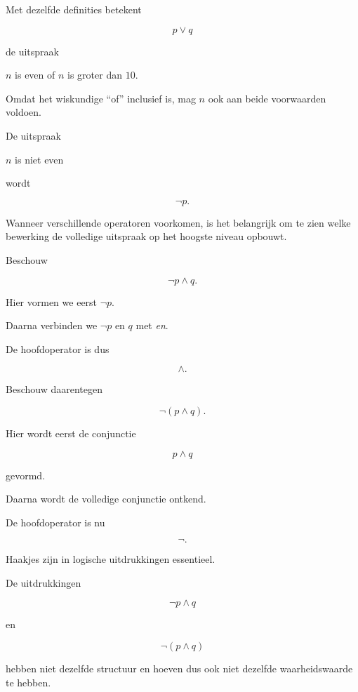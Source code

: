 \documentclass{ximera}
\begin{document}
  \begin{voorbeeld}

  Met dezelfde definities betekent

  \[
  p\lor q
  \]

  de uitspraak

  \begin{center}
  $n$ is even of $n$ is groter dan $10$.
  \end{center}

  Omdat het wiskundige ``of'' inclusief is, mag $n$ ook aan beide
  voorwaarden voldoen.
  \end{voorbeeld}


  \begin{voorbeeld}

  De uitspraak

  \begin{center}
  $n$ is niet even
  \end{center}

  wordt

  \[
  \neg p.
  \]
  \end{voorbeeld}



  Wanneer verschillende operatoren voorkomen, is het belangrijk om te
  zien welke bewerking de volledige uitspraak op het hoogste niveau
  opbouwt.

  Beschouw

  \[
  \neg p\land q.
  \]

  Hier vormen we eerst $\neg p$.

  Daarna verbinden we $\neg p$ en $q$ met \emph{en}.

  De hoofdoperator is dus

  \[
  \land.
  \]


  Beschouw daarentegen

  \[
  \neg(p\land q).
  \]

  Hier wordt eerst de conjunctie

  \[
  p\land q
  \]

  gevormd.

  Daarna wordt de volledige conjunctie ontkend.

  De hoofdoperator is nu

  \[
  \neg.
  \]


  \begin{opmerking}
  Haakjes zijn in logische uitdrukkingen essentieel.

  De uitdrukkingen

  \[
  \neg p\land q
  \]

  en

  \[
  \neg(p\land q)
  \]

  hebben niet dezelfde structuur en hoeven dus ook niet dezelfde
  waarheidswaarde te hebben.
  \end{opmerking}
\end{document}
